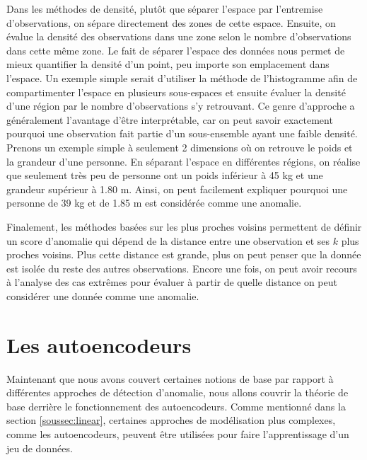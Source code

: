 Dans les méthodes de densité, plutôt que séparer l'espace par l'entremise d'observations, on sépare directement des zones de cette espace. Ensuite, on évalue la densité des observations dans une zone selon le nombre d'observations dans cette même zone. Le fait de séparer l'espace des données nous permet de mieux quantifier la densité d'un point, peu importe son emplacement dans l'espace. Un exemple simple serait d'utiliser la méthode de l'histogramme afin de compartimenter l'espace en plusieurs sous-espaces et ensuite évaluer la densité d'une région par le nombre d'observations s'y retrouvant. Ce genre d'approche a généralement l'avantage d'être interprétable, car on peut savoir exactement pourquoi une observation fait partie d'un sous-ensemble ayant une faible densité. Prenons un exemple simple à seulement 2 dimensions où on retrouve le poids et la grandeur d'une personne. En séparant l'espace en différentes régions, on réalise que seulement très peu de personne ont un poids inférieur à 45 kg et une grandeur supérieur à 1.80 m. Ainsi, on peut facilement expliquer pourquoi une personne de 39 kg et de 1.85 m est considérée comme une anomalie. 
 
 Finalement, les méthodes basées sur les plus proches voisins permettent de définir un score d'anomalie qui dépend de la distance entre une observation et ses $k$ plus proches voisins. Plus cette distance est grande, plus on peut penser que la donnée est isolée du reste des autres observations. Encore une fois, on peut avoir recours à l'analyse des cas extrêmes pour évaluer à partir de quelle distance on peut considérer une donnée comme une anomalie.


\section{Les autoencodeurs}

Maintenant que nous avons couvert certaines notions de base par rapport à différentes approches de détection d'anomalie, nous allons couvrir la théorie de base derrière le fonctionnement des autoencodeurs. Comme mentionné dans la section \ref{soussec:linear}, certaines approches de modélisation plus complexes, comme les autoencodeurs, peuvent être utilisées pour faire l'apprentissage d'un jeu de données. 

